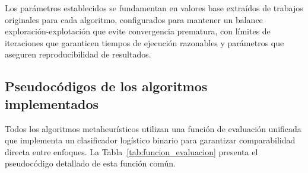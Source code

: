 Los parámetros establecidos se fundamentan en valores base extraídos de trabajos originales para cada algoritmo, configurados para mantener un balance exploración-explotación que evite convergencia prematura, con límites de iteraciones que garanticen tiempos de ejecución razonables y parámetros que aseguren reproducibilidad de resultados.

\subsection{Pseudocódigos de los algoritmos implementados}
\label{subsec:pseudocodigos_algoritmos}

Todos los algoritmos metaheurísticos utilizan una función de evaluación unificada que implementa un clasificador logístico binario para garantizar comparabilidad directa entre enfoques. La Tabla~\ref{tab:funcion_evaluacion} presenta el pseudocódigo detallado de esta función común.

\begin{table}[htbp]
\centering
{}
\caption{Función de evaluación común utilizada por todos los algoritmos metaheurísticos.}
\label{tab:funcion_evaluacion}
\end{table}



